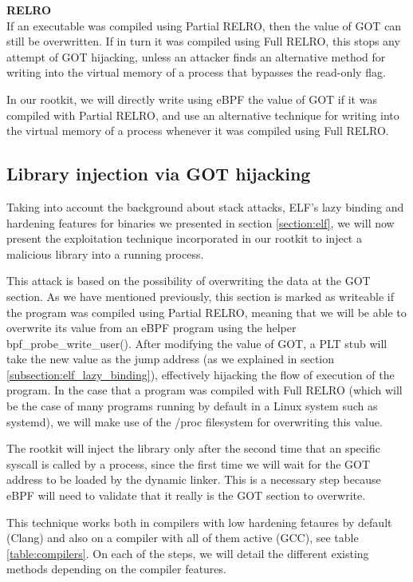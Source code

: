 \textbf{RELRO}\\
If an executable was compiled using Partial RELRO, then the value of GOT can still be overwritten. If in turn it was compiled using Full RELRO, this stops any attempt of GOT hijacking, unless an attacker finds an alternative method for writing into the virtual memory of a process that bypasses the read-only flag. 

In our rootkit, we will directly write using eBPF the value of GOT if it was compiled with Partial RELRO, and use an alternative technique for writing into the virtual memory of a process whenever it was compiled using Full RELRO.


\subsection{Library injection via GOT hijacking} \label{subsection:got_attack}
Taking into account the background about stack attacks, ELF's lazy binding and hardening features for binaries we presented in section \ref{section:elf}, we will now present the exploitation technique incorporated in our rootkit to inject a malicious library into a running process. 

This attack is based on the possibility of overwriting the data at the GOT section. As we have mentioned previously, this section is marked as writeable if the program was compiled using Partial RELRO, meaning that we will be able to overwrite its value from an eBPF program using the helper bpf\_probe\_write\_user(). After modifying the value of GOT, a PLT stub will take the new value as the jump address (as we explained in section \ref{subsection:elf_lazy_binding}), effectively hijacking the flow of execution of the program. In the case that a program was compiled with Full RELRO (which will be the case of many programs running by default in a Linux system such as systemd), we will make use of the /proc filesystem for overwriting this value.

The rootkit will inject the library only after the second time that an specific syscall is called by a process, since the first time we will wait for the GOT address to be loaded by the dynamic linker. This is a necessary step because eBPF will need to validate that it really is the GOT section to overwrite.

This technique works both in compilers with low hardening fetaures by default (Clang) and also on a compiler with all of them active (GCC), see table \ref{table:compilers}. On each of the steps, we will detail the different existing methods depending on the compiler features.

